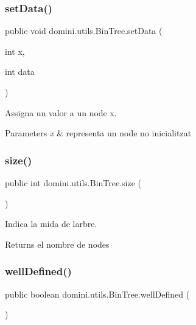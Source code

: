 \subsubsection{\texorpdfstring{set\+Data()}{setData()}}
{\footnotesize\ttfamily public void domini.\+utils.\+Bin\+Tree.\+set\+Data (\begin{DoxyParamCaption}\item[{int}]{x,  }\item[{int}]{data }\end{DoxyParamCaption})\hspace{0.3cm}{\ttfamily [inline]}}



Assigna un valor a un node x. 


\begin{DoxyParams}{Parameters}
{\em x} & representa un node no inicialitzat \\
\hline
\end{DoxyParams}
\mbox{\label{classdomini_1_1utils_1_1BinTree_afb98cb560c437784fe3ce1b8d6aa046e}} 
\subsubsection{\texorpdfstring{size()}{size()}}
{\footnotesize\ttfamily public int domini.\+utils.\+Bin\+Tree.\+size (\begin{DoxyParamCaption}{ }\end{DoxyParamCaption})\hspace{0.3cm}{\ttfamily [inline]}}



Indica la mida de l\textquotesingle{}arbre. 

\begin{DoxyReturn}{Returns}
el nombre de nodes 
\end{DoxyReturn}
\mbox{\label{classdomini_1_1utils_1_1BinTree_a30f097b37ebea20379d9c2930e8fa27f}} 
\subsubsection{\texorpdfstring{well\+Defined()}{wellDefined()}}
{\footnotesize\ttfamily public boolean domini.\+utils.\+Bin\+Tree.\+well\+Defined (\begin{DoxyParamCaption}{ }\end{DoxyParamCaption})\hspace{0.3cm}{\ttfamily [inline]}}



